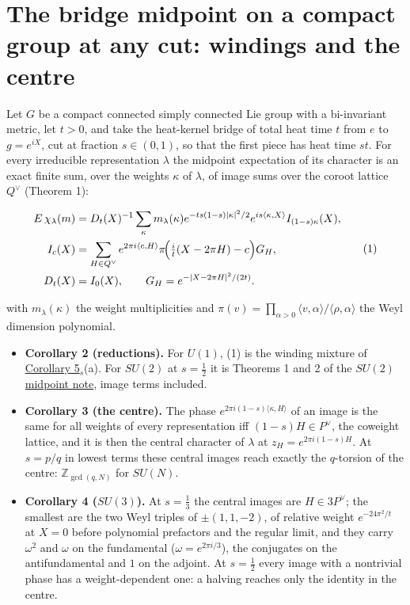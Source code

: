 \documentclass[11pt,a4paper]{article}
\newcommand{\tightlist}{\setlength{\itemsep}{0pt}\setlength{\parskip}{0pt}}
\begin{document}
\hypertarget{the-bridge-midpoint-on-a-compact-group-at-any-cut-windings-and-the-centre}{%
\section{The bridge midpoint on a compact group at any cut: windings and
the
centre}\label{the-bridge-midpoint-on-a-compact-group-at-any-cut-windings-and-the-centre}}

Let \(G\) be a compact connected simply connected Lie group with a
bi-invariant metric, let \(t>0\), and take the heat-kernel bridge of
total heat time \(t\) from \(e\) to \(g=e^{iX}\), cut at fraction
\(s\in(0,1)\), so that the first piece has heat time \(st\). For every
irreducible representation \(\lambda\) the midpoint expectation of its
character is an exact finite sum, over the weights \(\kappa\) of
\(\lambda\), of image sums over the coroot lattice \(Q^\vee\) (Theorem
1):

\[\begin{aligned}
E\,\chi_\lambda(m)
&=D_t(X)^{-1}\sum_\kappa m_\lambda(\kappa)
e^{-ts(1-s)|\kappa|^2/2}e^{is\langle\kappa,X\rangle}I_{(1-s)\kappa}(X),\\
I_c(X)&=\sum_{H\in Q^\vee}e^{2\pi i\langle c,H\rangle}
\pi\!\Bigl(\tfrac it(X-2\pi H)-c\Bigr)G_H,\\
D_t(X)&=I_0(X),\qquad G_H=e^{-|X-2\pi H|^2/(2t)}.
\end{aligned}\tag{1}\]

with \(m_\lambda(\kappa)\) the weight multiplicities and
\(\pi(v)=\prod_{\alpha>0}\langle v,\alpha\rangle/\langle\rho,\alpha\rangle\)
the Weyl dimension polynomial.

\begin{itemize}
\tightlist
\item
  \textbf{Corollary 2 (reductions).} For \(U(1)\), (1) is the winding
  mixture of \href{series-parallel-gauge-refinement.md}{Corollary
  5\(_s\)}(a). For \(SU(2)\) at \(s=\frac12\) it is Theorems 1 and 2 of
  the \href{su2-midpoint-exact.md}{\(SU(2)\) midpoint note}, image terms
  included.
\item
  \textbf{Corollary 3 (the centre).} The phase
  \(e^{2\pi i(1-s)\langle\kappa,H\rangle}\) of an image is the same for
  all weights of every representation iff \((1-s)H\in P^\vee\), the
  coweight lattice, and it is then the central character of \(\lambda\)
  at \(z_H=e^{2\pi i(1-s)H}\). At \(s=p/q\) in lowest terms these
  central images reach exactly the \(q\)-torsion of the centre:
  \(\mathbb Z_{\gcd(q,N)}\) for \(SU(N)\).
\item
  \textbf{Corollary 4 (\(SU(3)\)).} At \(s=\frac13\) the central images
  are \(H\in3P^\vee\); the smallest are the two Weyl triples of
  \(\pm(1,1,-2)\), of relative weight \(e^{-24\pi^2/t}\) at \(X=0\)
  before polynomial prefactors and the regular limit, and they carry
  \(\omega^2\) and \(\omega\) on the fundamental
  (\(\omega=e^{2\pi i/3}\)), the conjugates on the antifundamental and
  \(1\) on the adjoint. At \(s=\frac12\) every image with a nontrivial
  phase has a weight-dependent one: a halving reaches only the identity
  in the centre.
\end{itemize}
\end{document}
